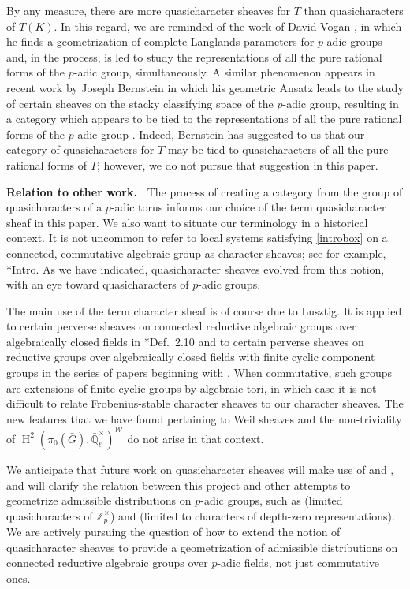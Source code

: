 \documentclass[10pt]{amsart}
\theoremstyle{plain}
\theoremstyle{definition}
\theoremstyle{remark}
\newcommand{\ZZ}{{\mathbb{Z}}}
\newcommand{\EE}{\mathbb{\bar Q}_\ell}
\newcommand{\EEx}{\EE^\times}
\newcommand{\Weil}[1]{\mathcal{W}_{#1}}
\DeclareMathOperator{\Hh}{H}
\newcommand{\bG}{\bar{G}}
\begin{document}
By any measure, there are more quasicharacter sheaves for $T$ than quasicharacters of $T(K)$.  
In this regard, we are reminded of the work of David Vogan \cite{vogan:93a}, in which he finds a geometrization of complete Langlands parameters for $p$-adic groups 
and, in the process, is led to study the representations of all the pure rational forms of the $p$-adic group, simultaneously.
A similar phenomenon appears in recent work by Joseph Bernstein in which his geometric Ansatz leads to the study of certain sheaves on the stacky classifying space of the $p$-adic group, resulting in a category which appears to be tied to the representations of all the pure rational forms of the $p$-adic group \cite{bernstein:vogan_conference}.
Indeed, Bernstein has suggested to us that our category of quasicharacters for $T$ may be tied to quasicharacters of all the pure rational forms of $T$; however, we do not pursue that suggestion in this paper.

\medskip
\noindent\textbf{Relation to other work.\ }
The process of creating a category from the group of quasicharacters of a $p$-adic  torus informs our choice of the term quasicharacter sheaf in this paper.
We also want to situate our terminology in a historical context.
It is not uncommon to refer to local systems satisfying \eqref{introbox} on a connected, commutative algebraic group as character sheaves;
see for example, \cite{kamgarpour:09a}*{Intro}.
As we have indicated, quasicharacter sheaves evolved from this notion,
with an eye toward quasicharacters of $p$-adic groups.

The main use of the term character sheaf is of course due to Lusztig.
It is applied to certain perverse sheaves on connected reductive algebraic groups over algebraically closed fields in
\cite{lusztig:85a}*{Def.~2.10} and to certain perverse sheaves on reductive groups
over algebraically closed fields with finite cyclic component groups in the series of papers
beginning with \cite{lusztig:disconnected1}.
When commutative, such groups are extensions of finite cyclic groups by algebraic tori,
in which case it is not difficult to relate Frobenius-stable character sheaves to our character sheaves. %
The new features that we have found pertaining to Weil sheaves and the non-triviality of $\Hh^2(\pi_0(\bG),\EEx)^{\Weil{}}$ do not arise in that context.

We anticipate that future work on quasicharacter sheaves will make use of   \cite{suzuki-yoshida:12a} and \cite{Suzuki:Neron}, and will clarify the relation between this project and other attempts to geometrize admissible distributions on $p$-adic groups, such as \cite{Cunningham-Kamgarpour} (limited quasicharacters of $\ZZ_p^\times$) and \cite{Aubert-Cunningham} (limited to characters of depth-zero representations). 
We are actively pursuing the question of how to extend the notion of quasicharacter sheaves to provide a geometrization of admissible distributions on connected reductive algebraic groups over $p$-adic fields, not just commutative ones.
\end{document}
